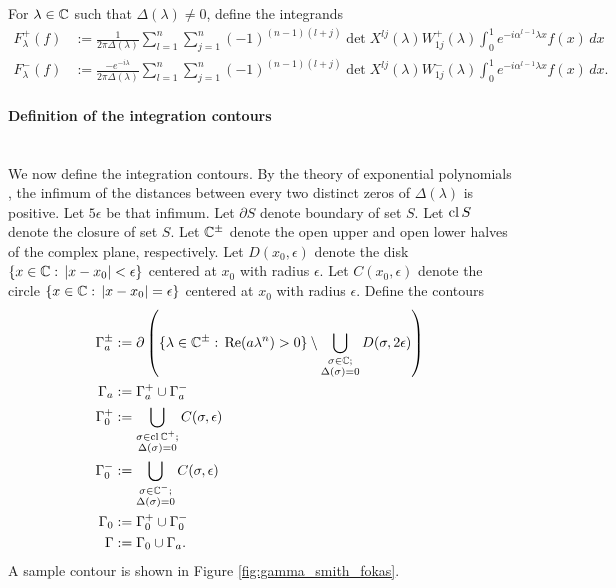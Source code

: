 \documentclass[12pt, oneside, a4paper]{article}
\begin{document}
For $\lambda\in\mathbb C$ such that $\Delta(\lambda)\neq 0$, define the integrands
\begin{subequations}\label{eq:F_lambda_+-}
    \begin{align}
        F^+_\lambda(f) &:= \frac{1}{2\pi \Delta(\lambda)} \sum_{l=1}^n\sum_{j=1}^n(-1)^{(n-1)(l+j)}\det X^{lj}(\lambda)W^+_{1j}(\lambda)\int_0^1 e^{-i\alpha^{l-1}\lambda x}f(x)\,dx \label{eq:F+}\\
        F^-_\lambda(f) &:= \frac{-e^{-i\lambda}}{2\pi \Delta(\lambda)} \sum_{l=1}^n\sum_{j=1}^n(-1)^{(n-1)(l+j)}\det X^{lj}(\lambda)W^-_{1j}(\lambda)\int_0^1 e^{-i\alpha^{l-1}\lambda x}f(x)\,dx. \label{eq:F-}
    \end{align}
\end{subequations}

\paragraph{Definition of the integration contours}\label{sec:contour_defn}\mbox{}\\
We now define the integration contours. By the theory of exponential polynomials \cite{Langer1931}, the infimum of the distances between every two distinct zeros of $\Delta(\lambda)$ is positive. Let $5\epsilon$ be that infimum. Let $\partial S$ denote boundary of set $S$. Let $\operatorname{cl}{S}$ denote the closure of set $S$. Let $\mathbb C^\pm$ denote the open upper and open lower halves of the complex plane, respectively. Let $D(x_0,\epsilon)$ denote the disk $\{x\in\mathbb C:\, |x-x_0|<\epsilon\}$ centered at $x_0$ with radius $\epsilon$. Let $C(x_0,\epsilon)$ denote the circle $\{x\in\mathbb C:\, |x-x_0|=\epsilon\}$ centered at $x_0$ with radius $\epsilon$. Define the contours
\begin{subequations}\label{eq:gamma}
    \begin{align}
        \Gamma_a^{\pm} &:= \partial\left(\{\lambda\in\mathbb C^{\pm}:\, \mathrm{Re}(a\lambda^n)>0\}\setminus \bigcup_{\substack{\sigma\in\mathbb C;\\\Delta(\sigma)=0}} D(\sigma, 2\epsilon)\right)\label{eq:gammaAPlusMinus}\\
        \Gamma_a &:= \Gamma_a^+\cup \Gamma_a^-\\
        \Gamma_0^+ &:= \bigcup_{\substack{\sigma\in\operatorname{cl}\mathbb C^+;\\ \Delta(\sigma)=0}} C(\sigma, \epsilon)\label{eq:gamma0Plus}\\
        \Gamma_0^- &:= \bigcup_{\substack{\sigma\in\mathbb C^-;\\ \Delta(\sigma)=0}} C(\sigma, \epsilon)\label{eq:gamma0Minus}\\
        \Gamma_0 &:= \Gamma_0^+\cup \Gamma_0^-\\
        \Gamma &:= \Gamma_0\cup \Gamma_a.
    \end{align}
\end{subequations}
A sample contour is shown in Figure \ref{fig:gamma_smith_fokas}.
\end{document}
